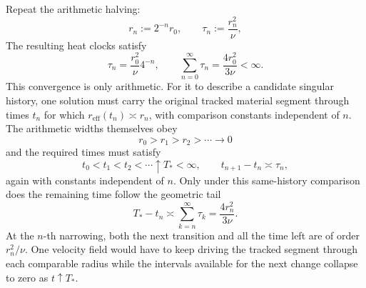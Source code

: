 
Repeat the arithmetic halving:
\[
  r_n:=2^{-n}r_0,
  \qquad
  \tau_n:=\frac{r_n^2}{\nu},
\]
The resulting heat clocks satisfy
\[
  \tau_n
  =
  \frac{r_0^2}{\nu}4^{-n},
  \qquad
  \sum_{n=0}^{\infty}\tau_n
  =
  \frac{4r_0^2}{3\nu}
  <
  \infty.
\]
This convergence is only arithmetic. For it to describe a candidate singular history, one \NavierStokes{} solution must carry the original tracked material segment through times \(t_n\) for which \(r_{\mathrm{eff}}(t_n)\asymp r_n\), with comparison constants independent of \(n\). The arithmetic widths themselves obey
\[
  r_0>r_1>r_2>\cdots\longrightarrow0
\]
and the required times must satisfy
\[
  t_0<t_1<t_2<\cdots\uparrow T_*<\infty,
  \qquad
  t_{n+1}-t_n\asymp\tau_n,
\]
again with constants independent of \(n\). Only under this same-history comparison does the remaining time follow the geometric tail
\[
  T_*-t_n
  \asymp
  \sum_{k=n}^{\infty}\tau_k
  =
  \frac{4r_n^2}{3\nu}.
\]
At the \(n\)-th narrowing, both the next transition and all the time left are of order \(r_n^2/\nu\). One velocity field would have to keep driving the tracked segment through each comparable radius while the intervals available for the next change collapse to zero as \(t\uparrow T_*\).
